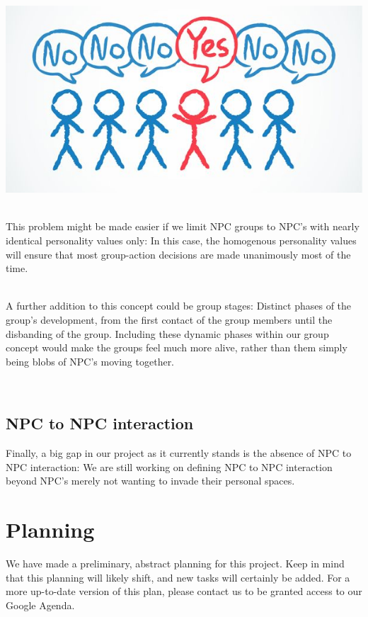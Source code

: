\documentclass[11pt]{article} %
\begin{document}
~\\
\includegraphics[scale=0.7]{PeerPressure}



~\\
This problem might be made easier if we limit NPC groups to NPC's with nearly identical personality values only: In this case, the homogenous personality values will ensure that most group-action decisions are made unanimously most of the time.

~\\
A further addition to this concept could be group stages: Distinct phases of the group's development, from the first contact of the group members until the disbanding of the group. Including these dynamic phases within our group concept would make the groups feel much more alive, rather than them simply being blobs of NPC's moving together.

~\\
\subsection{NPC to NPC interaction}
Finally, a big gap in our project as it currently stands is the absence of NPC to NPC interaction: We are still working on defining NPC to NPC interaction beyond NPC's merely not wanting to invade their personal spaces.

\newpage
\section{Planning}
We have made a preliminary, abstract planning for this project. Keep in mind that this planning will likely shift, and new tasks will certainly be added. For a more up-to-date version of this plan, please contact us to be granted access to our Google Agenda.
\end{document}

